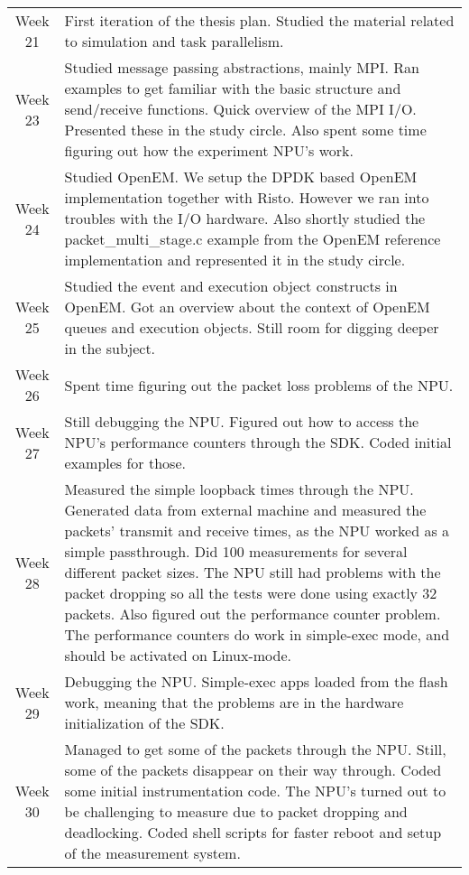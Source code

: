 \begin{center}
  \begin{longtable}{@{}c|p{10cm}@{}}
    \toprule
    Week 21 & First iteration of the thesis plan. Studied the material related to simulation and task parallelism. \\
    Week 23 & Studied message passing abstractions, mainly MPI. Ran examples to get familiar with the basic structure and send/receive functions. Quick overview of the MPI I/O. Presented these in the study circle. Also spent some time figuring out how the experiment NPU's work. \\
    Week 24 & Studied OpenEM. We setup the DPDK based OpenEM implementation together with Risto. However we ran into troubles with the I/O hardware. Also shortly studied the packet\_multi\_stage.c example from the OpenEM reference implementation and represented it in the study circle. \\
    Week 25 & Studied the event and execution object constructs in OpenEM. Got an overview about the context of OpenEM queues and execution objects. Still room for digging deeper in the subject. \\
    Week 26 & Spent time figuring out the packet loss problems of the NPU. \\
    Week 27 & Still debugging the NPU. Figured out how to access the NPU's performance counters through the SDK. Coded initial examples for those. \\
    Week 28 & Measured the simple loopback times through the NPU. Generated data from external machine and measured the packets' transmit and receive times, as the NPU worked as a simple passthrough. Did 100 measurements for several different packet sizes. The NPU still had problems with the packet dropping so all the tests were done using exactly 32 packets. Also figured out the performance counter problem. The performance counters do work in simple-exec mode, and should be activated on Linux-mode.  \\
    Week 29 & Debugging the NPU. Simple-exec apps loaded from the flash work, meaning that the problems are in the hardware initialization of the SDK. \\
    Week 30 & Managed to get some of the packets through the NPU. Still, some of the packets disappear on their way through. Coded some initial instrumentation code. The NPU's turned out to be challenging to measure due to packet dropping and deadlocking. Coded shell scripts for faster reboot and setup of the measurement system. \\

\end{longtable}
\end{center}

